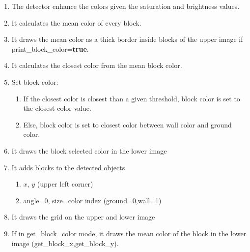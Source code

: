     \begin{enumerate}
        \item The detector enhance the colors given the saturation and 
            brightness values.
        \item It calculates the mean color of every block.
        \item It draws the mean color as a thick border inside blocks of 
            the upper image if print\_block\_color={\bf true}.
        \item It calculates the closest color from the mean block color.
        \item Set block color:
        \begin{enumerate}
            \item If the closest color is closest than a given threshold, 
                block color is set to the closest color value.
            \item Else, block color is set to closest color between 
                wall color and ground color.
        \end{enumerate}
        \item It draws the block selected color in the lower image 
        \item It adds blocks to the detected objects
        \begin{enumerate}
            \item $x$, $y$ (upper left corner)
            \item angle=0, size=color index (ground=0,wall=1)
        \end{enumerate}
        \item It draws the grid on the upper and lower image
        \item If in get\_block\_color mode, it draws the mean color of 
            the block in the lower image (get\_block\_x,get\_block\_y).
 
    \end{enumerate}

